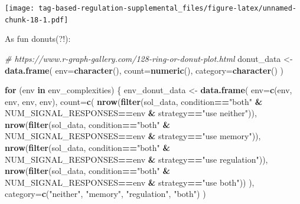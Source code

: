 \documentclass[
]{book}
\newenvironment{Shaded}{\begin{snugshade}}{\end{snugshade}}
\newcommand{\CommentTok}[1]{\textcolor[rgb]{0.56,0.35,0.01}{\textit{#1}}}
\newcommand{\ControlFlowTok}[1]{\textcolor[rgb]{0.13,0.29,0.53}{\textbf{#1}}}
\newcommand{\DataTypeTok}[1]{\textcolor[rgb]{0.13,0.29,0.53}{#1}}
\newcommand{\KeywordTok}[1]{\textcolor[rgb]{0.13,0.29,0.53}{\textbf{#1}}}
\newcommand{\NormalTok}[1]{#1}
\newcommand{\OperatorTok}[1]{\textcolor[rgb]{0.81,0.36,0.00}{\textbf{#1}}}
\newcommand{\StringTok}[1]{\textcolor[rgb]{0.31,0.60,0.02}{#1}}
\begin{document}
\texttt{[image: tag-based-regulation-supplemental\_files/figure-latex/unnamed-chunk-18-1.pdf]}

As fun donuts(?!):

\begin{Shaded}
\begin{Highlighting}[]
\CommentTok{\# https://www.r{-}graph{-}gallery.com/128{-}ring{-}or{-}donut{-}plot.html}
\NormalTok{donut\_data \textless{}{-}}\StringTok{ }\KeywordTok{data.frame}\NormalTok{(}
  \DataTypeTok{env=}\KeywordTok{character}\NormalTok{(),}
  \DataTypeTok{count=}\KeywordTok{numeric}\NormalTok{(),}
  \DataTypeTok{category=}\KeywordTok{character}\NormalTok{()}
\NormalTok{)}

\ControlFlowTok{for}\NormalTok{ (env }\ControlFlowTok{in}\NormalTok{ env\_complexities) \{}
\NormalTok{  env\_donut\_data  \textless{}{-}}\StringTok{ }\KeywordTok{data.frame}\NormalTok{(}
    \DataTypeTok{env=}\KeywordTok{c}\NormalTok{(env, env, env, env),}
    \DataTypeTok{count=}\KeywordTok{c}\NormalTok{(}
      \KeywordTok{nrow}\NormalTok{(}\KeywordTok{filter}\NormalTok{(sol\_data, condition}\OperatorTok{==}\StringTok{"both"} \OperatorTok{\&}\StringTok{ }\NormalTok{NUM\_SIGNAL\_RESPONSES}\OperatorTok{==}\NormalTok{env }\OperatorTok{\&}\StringTok{ }\NormalTok{strategy}\OperatorTok{==}\StringTok{"use neither"}\NormalTok{)),}
      \KeywordTok{nrow}\NormalTok{(}\KeywordTok{filter}\NormalTok{(sol\_data, condition}\OperatorTok{==}\StringTok{"both"} \OperatorTok{\&}\StringTok{ }\NormalTok{NUM\_SIGNAL\_RESPONSES}\OperatorTok{==}\NormalTok{env }\OperatorTok{\&}\StringTok{ }\NormalTok{strategy}\OperatorTok{==}\StringTok{"use memory"}\NormalTok{)),}
      \KeywordTok{nrow}\NormalTok{(}\KeywordTok{filter}\NormalTok{(sol\_data, condition}\OperatorTok{==}\StringTok{"both"} \OperatorTok{\&}\StringTok{ }\NormalTok{NUM\_SIGNAL\_RESPONSES}\OperatorTok{==}\NormalTok{env }\OperatorTok{\&}\StringTok{ }\NormalTok{strategy}\OperatorTok{==}\StringTok{"use regulation"}\NormalTok{)),}
      \KeywordTok{nrow}\NormalTok{(}\KeywordTok{filter}\NormalTok{(sol\_data, condition}\OperatorTok{==}\StringTok{"both"} \OperatorTok{\&}\StringTok{ }\NormalTok{NUM\_SIGNAL\_RESPONSES}\OperatorTok{==}\NormalTok{env }\OperatorTok{\&}\StringTok{ }\NormalTok{strategy}\OperatorTok{==}\StringTok{"use both"}\NormalTok{))}
\NormalTok{    ),}
    \DataTypeTok{category=}\KeywordTok{c}\NormalTok{(}\StringTok{"neither"}\NormalTok{, }\StringTok{"memory"}\NormalTok{, }\StringTok{"regulation"}\NormalTok{, }\StringTok{"both"}\NormalTok{)}
\NormalTok{  )}


\end{Highlighting}
\end{Shaded}
\end{document}
